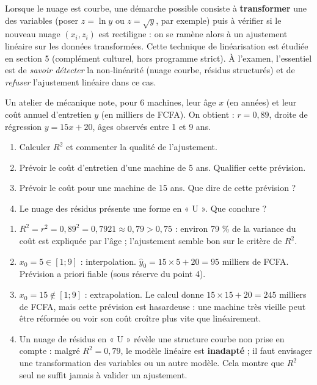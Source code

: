\documentclass[11pt]{article}
\newcommand{\cle}[1]{{\popxbold\color{popdark}#1}}
\begin{document}
\begin{aretenir}
Lorsque le nuage est courbe, une démarche possible consiste à \textbf{transformer} une des variables (poser $z = \ln y$ ou $z = \sqrt{y}$, par exemple) puis à vérifier si le nouveau nuage $(x_i, z_i)$ est rectiligne : on se ramène alors à un ajustement linéaire sur les données transformées. Cette technique de \cle{linéarisation} est étudiée en section 5 (complément culturel, hors programme strict). À l'examen, l'essentiel est de \emph{savoir détecter} la non-linéarité (nuage courbe, résidus structurés) et de \emph{refuser} l'ajustement linéaire dans ce cas.
\end{aretenir}

\begin{exercice}
Un atelier de mécanique note, pour 6 machines, leur âge $x$ (en années) et leur coût annuel d'entretien $y$ (en milliers de FCFA). On obtient : $r = 0{,}89$, droite de régression $y = 15x + 20$, âges observés entre 1 et 9 ans.
\begin{enumerate}
\item Calculer $R^2$ et commenter la qualité de l'ajustement.
\item Prévoir le coût d'entretien d'une machine de 5 ans. Qualifier cette prévision.
\item Prévoir le coût pour une machine de 15 ans. Que dire de cette prévision ?
\item Le nuage des résidus présente une forme en « U ». Que conclure ?
\end{enumerate}
\end{exercice}

\begin{corrige}
\begin{enumerate}
\item $R^2 = r^2 = 0{,}89^2 = 0{,}7921 \approx 0{,}79 > 0{,}75$ : environ 79 \% de la variance du coût est expliquée par l'âge ; l'ajustement semble bon sur le critère de $R^2$.
\item $x_0 = 5 \in [1 ; 9]$ : interpolation. $\hat{y}_0 = 15 \times 5 + 20 = 95$ milliers de FCFA. Prévision a priori fiable (sous réserve du point 4).
\item $x_0 = 15 \notin [1 ; 9]$ : extrapolation. Le calcul donne $15 \times 15 + 20 = 245$ milliers de FCFA, mais cette prévision est hasardeuse : une machine très vieille peut être réformée ou voir son coût croître plus vite que linéairement.
\item Un nuage de résidus en « U » révèle une structure courbe non prise en compte : malgré $R^2 = 0{,}79$, le modèle linéaire est \textbf{inadapté} ; il faut envisager une transformation des variables ou un autre modèle. Cela montre que $R^2$ seul ne suffit jamais à valider un ajustement.
\end{enumerate}
\end{corrige}
\end{document}
